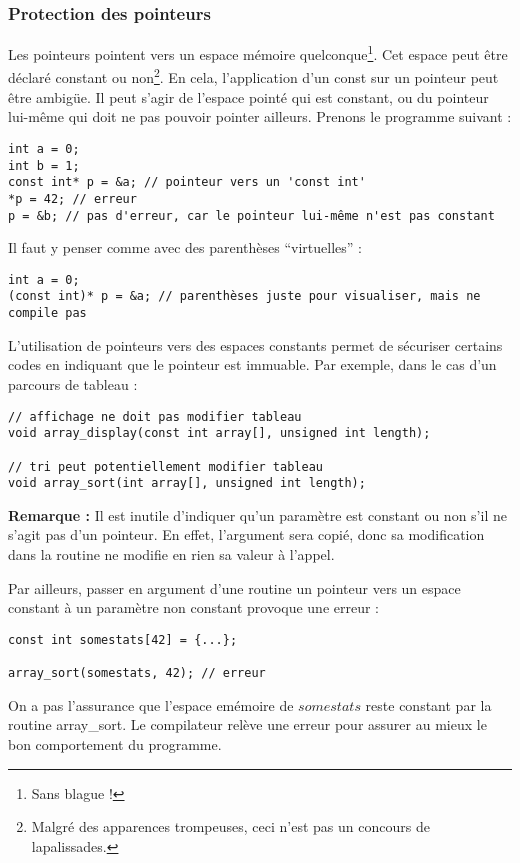 \documentclass[../../../main.tex]{subfiles}
\begin{document}
\subsubsection{Protection des pointeurs}
\label{ssub:protection_des_pointeurs}
Les pointeurs pointent vers un espace mémoire quelconque\footnote{Sans blague !}. Cet espace peut être déclaré constant ou non\footnote{Malgré des apparences trompeuses, ceci n'est pas un concours de lapalissades.}. En cela, l'application d'un \textsf{const} sur un pointeur peut être ambigüe. Il peut s'agir de l'espace pointé qui est constant, ou du pointeur lui-même qui doit ne pas pouvoir pointer ailleurs. Prenons le programme suivant :
\begin{verbatim}
int a = 0;
int b = 1;
const int* p = &a; // pointeur vers un 'const int'
*p = 42; // erreur 
p = &b; // pas d'erreur, car le pointeur lui-même n'est pas constant
\end{verbatim}
Il faut y penser comme avec des parenthèses ``virtuelles'' :
\begin{verbatim}
int a = 0;
(const int)* p = &a; // parenthèses juste pour visualiser, mais ne compile pas
\end{verbatim}
L'utilisation de pointeurs vers des espaces constants permet de sécuriser certains codes en indiquant que le pointeur est immuable.\newline
Par exemple, dans le cas d'un parcours de tableau :
\begin{verbatim}
// affichage ne doit pas modifier tableau
void array_display(const int array[], unsigned int length);

// tri peut potentiellement modifier tableau
void array_sort(int array[], unsigned int length);
\end{verbatim}
\textbf{Remarque :} Il est inutile d'indiquer qu'un paramètre est constant ou non s'il ne s'agit pas d'un pointeur. En effet, l'argument sera copié, donc sa modification dans la routine ne modifie en rien sa valeur à l'appel.

Par ailleurs, passer en argument d'une routine un pointeur vers un espace constant à un paramètre non constant provoque une erreur :
\begin{verbatim}
const int somestats[42] = {...};

array_sort(somestats, 42); // erreur
\end{verbatim}
On a pas l'assurance que l'espace emémoire de $somestats$ reste constant par la routine \textsf{array\_sort}. Le compilateur relève une erreur pour assurer au mieux le bon comportement du programme.
\end{document}
